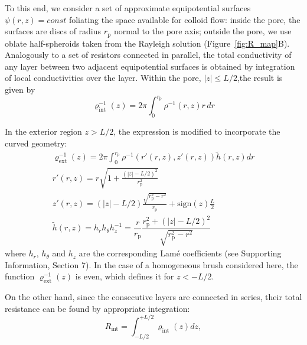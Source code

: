 \documentclass[12pt, a4paper]{article}
\begin{document}
To this end, we consider a set of approximate equipotential surfaces $\psi(r,z)=const$ foliating the space available for colloid flow: inside the pore, the surfaces are discs of radius $r_{\text{p}}$ normal to the pore axis; outside the pore, we use oblate half-spheroids taken from the Rayleigh solution \cite{Strutt1878} (Figure~\ref{fig:R_map}B).
Analogously to a set of resistors connected in parallel, the total conductivity of any layer between two adjacent equipotential surfaces is obtained by integration of local conductivities over the layer. Within the pore, $|z|\leq L/2$,the result is given by
\begin{equation}
\varrho_{\text{int}}^{-1}(z)= 2\pi\int_{0}^{r_{\text{p}}^{}} \rho^{-1}(r,z) r \, dr
\label{varrho1}
\end{equation}

In the exterior region $z >L/2$, the expression is modified to incorporate the curved geometry:
\begin{equation}
    \begin{gathered}
        \varrho_{\text{ext}}^{-1}(z)= 2\pi\int_{0}^{r_{\text{p}}^{}} \rho^{-1}\left( r'(r,z), z'(r,z) \right)  \tilde{h} (r,z) dr\\
        r'(r,z) = r\sqrt{1 + \frac{(|z| - L/2)^2}{r_{\text{p}}^2}}\\
        z'(r,z) = (|z| - L/2) \frac{\sqrt{r_{\text{p}}^2 - r^2}}{r_{\text{p}}} +  \text{sign}(z) \frac{L}{2}\\
        \tilde{h} (r,z) = h_r h_{\theta} h_z^{-1} = \dfrac{r}{r_{\text{p}}}\dfrac{r_{\text{p}}^2 + (|z|-L/2)^2}{\sqrt{r_{\text{p}}^2 - r^2}}
    \end{gathered}
\label{varrho2}
\end{equation}
where $h_r$, $h_{\theta}$ and $h_z$ are the corresponding Lam\'e coefficients (see Supporting Information, Section 7). In the case of a homogeneous brush considered here, the function $\varrho_{\text{ext}}^{-1}(z)$ is even, which defines it for $z<-L/2$.


On the other hand, since the consecutive layers are connected in series, their total resistance can be found by appropriate integration:
\begin{equation}
    R_{\text{int}} = \int_{-L/2}^{+L/2}\varrho_{\text{int}}(z) dz,
    \label{R_int}
\end{equation}
\end{document}
